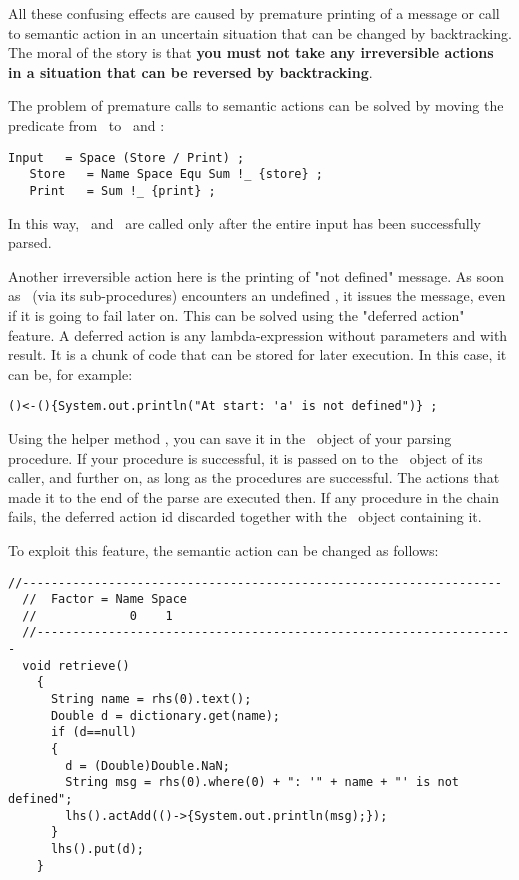 All these confusing effects are caused by premature printing of a message
or call to semantic action in an uncertain situation that can be changed by backtracking.
%
The moral of the story is that \textbf{you must not take any irreversible actions
in a situation that can be reversed by backtracking}.

The problem of premature calls to semantic actions 
can be solved by moving the predicate  from \Input\ 
to \Store\ and \Print:

\small
\begin{Verbatim}[frame=single,framesep=2mm,samepage=true,xleftmargin=15mm,xrightmargin=15mm,baselinestretch=0.8]
   Input   = Space (Store / Print) ;
   Store   = Name Space Equ Sum !_ {store} ;
   Print   = Sum !_ {print} ;
\end{Verbatim}
\normalsize

In this way, \Storea\ and \Printa\ are called only after the entire input
has been successfully parsed.

Another irreversible action here is the printing of "not defined" message.
As soon as \Print\ (via its sub-procedures) encounters an undefined ,
it issues the message, even if it is going to fail later on.
This can be solved using the "deferred action" feature.
A deferred action is any lambda-expression without parameters and with  result.
It  is a chunk of code that can be stored for later execution.
In this case, it can be, for example: 

\small
\begin{Verbatim}[frame=single,framesep=2mm,samepage=true,xleftmargin=15mm,xrightmargin=15mm,baselinestretch=0.8]
   ()<-(){System.out.println("At start: 'a' is not defined")} ;
\end{Verbatim}
\normalsize

Using the helper method , you can save it in the \Phrase\ object of your parsing procedure.
If your procedure is successful, it is passed on to the \Phrase\ object of its caller, and further on,
as long as the procedures are successful.
The actions that made it to the end of the parse are executed then.
If any procedure in the chain fails, the deferred action id discarded together with the \Phrase\ 
object containing it.

To exploit this feature, the semantic action  can be changed as follows:

\small
\begin{Verbatim}[frame=single,framesep=2mm,samepage=true,xleftmargin=15mm,xrightmargin=15mm,baselinestretch=0.8]
  //-------------------------------------------------------------------
  //  Factor = Name Space
  //             0    1
  //-------------------------------------------------------------------
  void retrieve()
    {
      String name = rhs(0).text();
      Double d = dictionary.get(name);
      if (d==null)
      {
        d = (Double)Double.NaN;
        String msg = rhs(0).where(0) + ": '" + name + "' is not defined";
        lhs().actAdd(()->{System.out.println(msg);});
      }
      lhs().put(d);
    }
\end{Verbatim}
\normalsize

